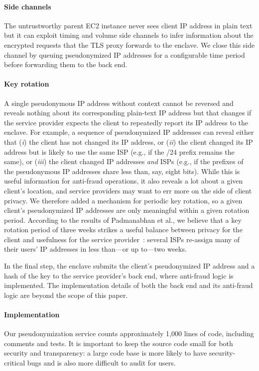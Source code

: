 \paragraph{Side channels}
The untrustworthy parent EC2 instance never sees client IP address in plain text
but it can exploit timing and volume side channels to infer information about
the encrypted requests that the TLS proxy forwards to the enclave.  We close
this side channel by queuing pseudonymized IP addresses for a configurable time
period before forwarding them to the back end.

\paragraph{Key rotation}
A single pseudonymous IP address without context cannot be reversed and reveals
nothing about its corresponding plain-text IP address but that changes if the
service provider expects the client to repeatedly report its IP address to the
enclave.  For example, a sequence of pseudonymized IP addresses can reveal
either that (\emph{i}) the client has not changed its IP address, or (\emph{ii})
the client changed its IP address but is likely to use the same ISP (e.g., if
the /24 prefix remains the same), or (\emph{iii}) the client changed IP
addresses \emph{and} ISPs (e.g., if the prefixes of the pseudonymous IP
addresses share less than, say, eight bits).  While this is useful information
for anti-fraud operations, it also reveals a lot about a given client's
location, and service providers may want to err more on the side of client
privacy.  We therefore added a mechanism for periodic key rotation, so a given
client's pseudonymized IP addresses are only meaningful within a given rotation
period.  According to the results of Padmanabhan et al., we believe that a key
rotation period of three weeks strikes a useful balance between privacy for the
client and usefulness for the service provider~\cite[\S~3.2]{Padmanabhan20a}:
several ISPs re-assign many of their users' IP addresses in less than---or up
to---two weeks.

In the final step, the enclave submits the client's pseudonymized IP address and
a hash of the key to the service provider's back end, where anti-fraud logic is
implemented.  The implementation details of both the back end and its anti-fraud
logic are beyond the scope of this paper.

\paragraph{Implementation}
Our pseudonymization service counts approximately 1,000 lines of code, including
comments and tests.  It is important to keep the source code small for both
security and transparency: a large code base is more likely to have
security-critical bugs and is also more difficult to audit for users.

